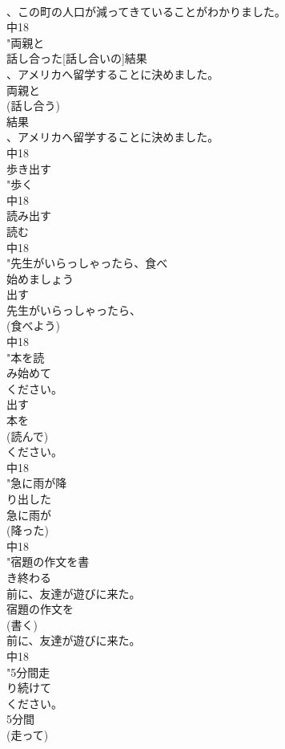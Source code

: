 \documentclass[8pt]{extreport}
\begin{document}
\begin{CJK}{UTF8}{min}
\\	、この町の人口が減ってきていることがわかりました。
\\	中18
\\	"両親と
\\	話し合った[話し合いの]結果
\\	、アメリカへ留学することに決めました。
\\	両親と
\\	(話し合う)
\\	結果
\\	、アメリカへ留学することに決めました。
\\	中18
\\	歩き出す	
\\	"歩く
\\	中18
\\	読み出す	
\\	読む
\\	中18
\\	"先生がいらっしゃったら、食べ
\\	始めましょう
\\	出す 
\\	先生がいらっしゃったら、
\\	(食べよう)
\\	中18
\\	"本を読
\\	み始めて
\\	ください。
\\	出す 
\\	本を
\\	(読んで)
\\	ください。
\\	中18
\\	"急に雨が降
\\	り出した
\\	急に雨が
\\	(降った)
\\	中18
\\	"宿題の作文を書
\\	き終わる
\\	前に、友達が遊びに来た。
\\	宿題の作文を
\\	(書く)
\\	前に、友達が遊びに来た。
\\	中18
\\	"5分間走
\\	り続けて
\\	ください。
\\	5分間
\\	(走って)

\end{CJK}
\end{document}
